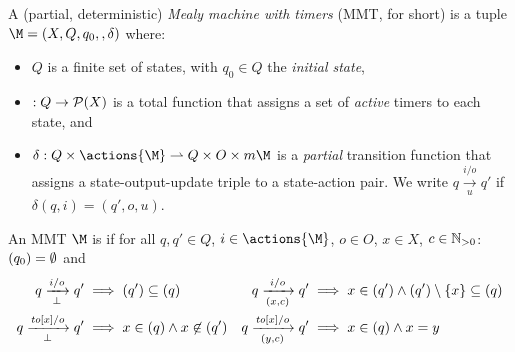 \begin{definition}\label{def:MMT}
  A (partial, deterministic) \emph{Mealy machine with timers} (MMT, for short) is a tuple
  \(\M = (X, Q, q_0, \activeTimers, \delta)\) where:
  \begin{itemize}
    \item
    \(Q\) is a finite set of states, with \(q_0 \in Q\) the \emph{initial state},
    \item
    \( : Q \to {\mathcal{P}}(X)\) is a total function that assigns a
    set of \emph{active} timers to each state,
    and
    \item
    \(\delta : Q \times \actions{\M} \partto Q \times O \times \updates{\M}\)
    is a \emph{partial} transition function that assigns a state-output-update triple to a
    state-action pair.
    We write \(q \xrightarrow[u]{i/o} q'\) if \(\delta(q, i) = (q', o, u)\).
  \end{itemize}
  An MMT 
  \(\M\) is 
  \emph{\sound} if for all \(q, q' \in Q\),
  \(i \in \actions{\M}\), \(o \in O\), \(x \in X\), \(c \in {\mathbb N}_{>0}\): $(q_0) = \emptyset$ and
  \begin{align*}
  q \xrightarrow[\bot]{i/o} q' \implies{} &
    (q') \subseteq (q)
  &
  q \xrightarrow[(x, c)]{i/o} q' \implies{} &
    x \in (q')
    \land (q') \setminus \{x\} \subseteq (q)
  \\
  q \xrightarrow[\bot]{\mathit{to}[x]/o} q' \implies{} &
    x \in (q) \land x \not\in (q')
  &
  q \xrightarrow[(y, c)]{\mathit{to}[x]/o} q' \implies {} &
    x \in (q) \land x=y
  \end{align*}
\end{definition}
